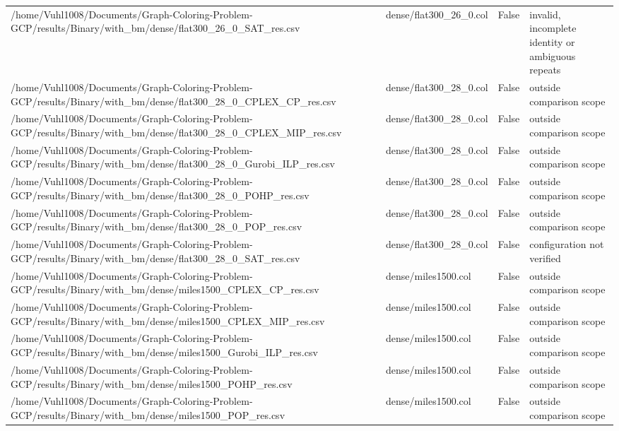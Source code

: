 \begin{table}[htbp]
\begin{tabular}{llll}
/home/Vuhl1008/Documents/Graph-Coloring-Problem-GCP/results/Binary/with\_bm/dense/flat300\_26\_0\_SAT\_res.csv & dense/flat300\_26\_0.col & False & invalid, incomplete identity or ambiguous repeats \\
/home/Vuhl1008/Documents/Graph-Coloring-Problem-GCP/results/Binary/with\_bm/dense/flat300\_28\_0\_CPLEX\_CP\_res.csv & dense/flat300\_28\_0.col & False & outside comparison scope \\
/home/Vuhl1008/Documents/Graph-Coloring-Problem-GCP/results/Binary/with\_bm/dense/flat300\_28\_0\_CPLEX\_MIP\_res.csv & dense/flat300\_28\_0.col & False & outside comparison scope \\
/home/Vuhl1008/Documents/Graph-Coloring-Problem-GCP/results/Binary/with\_bm/dense/flat300\_28\_0\_Gurobi\_ILP\_res.csv & dense/flat300\_28\_0.col & False & outside comparison scope \\
/home/Vuhl1008/Documents/Graph-Coloring-Problem-GCP/results/Binary/with\_bm/dense/flat300\_28\_0\_POHP\_res.csv & dense/flat300\_28\_0.col & False & outside comparison scope \\
/home/Vuhl1008/Documents/Graph-Coloring-Problem-GCP/results/Binary/with\_bm/dense/flat300\_28\_0\_POP\_res.csv & dense/flat300\_28\_0.col & False & outside comparison scope \\
/home/Vuhl1008/Documents/Graph-Coloring-Problem-GCP/results/Binary/with\_bm/dense/flat300\_28\_0\_SAT\_res.csv & dense/flat300\_28\_0.col & False & configuration not verified \\
/home/Vuhl1008/Documents/Graph-Coloring-Problem-GCP/results/Binary/with\_bm/dense/miles1500\_CPLEX\_CP\_res.csv & dense/miles1500.col & False & outside comparison scope \\
/home/Vuhl1008/Documents/Graph-Coloring-Problem-GCP/results/Binary/with\_bm/dense/miles1500\_CPLEX\_MIP\_res.csv & dense/miles1500.col & False & outside comparison scope \\
/home/Vuhl1008/Documents/Graph-Coloring-Problem-GCP/results/Binary/with\_bm/dense/miles1500\_Gurobi\_ILP\_res.csv & dense/miles1500.col & False & outside comparison scope \\
/home/Vuhl1008/Documents/Graph-Coloring-Problem-GCP/results/Binary/with\_bm/dense/miles1500\_POHP\_res.csv & dense/miles1500.col & False & outside comparison scope \\
/home/Vuhl1008/Documents/Graph-Coloring-Problem-GCP/results/Binary/with\_bm/dense/miles1500\_POP\_res.csv & dense/miles1500.col & False & outside comparison scope \\

\end{tabular}
\end{table}
